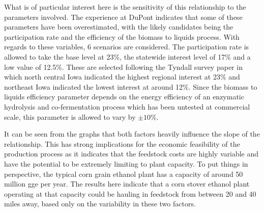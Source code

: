 \documentclass[12pt]{article}\usepackage[]{graphicx}\usepackage[]{color}
\begin{document}
What is of particular interest here is the sensitivity of this relationship to the parameters involved.  The experience at DuPont indicates that some of these parameters have been overestimated, with the likely candidates being the participation rate and the efficiency of the biomass to liquids process.  With regards to these variables, 6 scenarios are considered.  The participation rate is allowed to take the base level at 23\%, the statewide interest level of 17\% and a low value of 12.5\%.  These are selected following the Tyndall survey paper in which north central Iowa indicated the highest regional interest at 23\% and northeast Iowa indicated the lowest interest at around 12\%.  Since the biomass to liquids efficiency parameter depends on the energy efficiency of an enzymatic hydrolysis and co-fermentation process which has been untested at commercial scale, this parameter is allowed to vary by $\pm 10$\%.

It can be seen from the graphs that both factors heavily influence the slope of the relationship.  This has strong implications for the economic feasibility of the production process as it indicates that the feedstock costs are highly variable and have the potential to be extremely limiting to plant capacity.  To put things in perspective, the typical corn grain ethanol plant has a capacity of around 50 million gge per year.  The results here indicate that a corn stover ethanol plant operating at that capacity could be hauling in feedstock from between 20 and 40 miles away, based only on the variability in these two factors.
\end{document}
